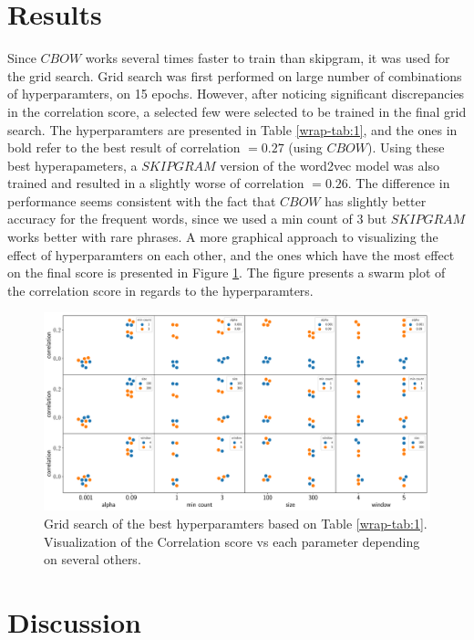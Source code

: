 \documentclass[12pt,a4paper]{article}
\begin{document}
\section{Results}

Since $CBOW$ works several times faster to train than skipgram, it was used for the grid search.
Grid search was first performed on large number of combinations of hyperparamters, on 15 epochs. However, after noticing significant discrepancies in the correlation score, a selected few were selected to be trained in the final grid search. The hyperparamters are presented in Table \ref{wrap-tab:1}, and the ones in bold refer to the best result of correlation $= 0.27$ (using $CBOW$). Using these best hyperapameters, a $SKIPGRAM$ version of the word2vec model was also trained and resulted in a slightly worse of correlation $= 0.26$. The difference in performance seems consistent with the fact that $CBOW$ has slightly better accuracy for the frequent words, since we used a min count of 3 but $SKIPGRAM$ works better with rare phrases. A more graphical approach to visualizing the effect of hyperparamters on each other, and the ones which have the most effect on the final score is presented in Figure \ref{img:grid}. The figure presents a swarm plot of the correlation score in regards to the hyperparamters. 

\begin{figure}[h]
\begin{center}
\includegraphics[width=\columnwidth, angle = 0]{img/grid.pdf}
\end{center}
\caption{Grid search of the best hyperparamters based on Table \ref{wrap-tab:1}. Visualization of the Correlation score vs each parameter depending on several others.}
\label{img:grid}
\end{figure}
 
\section{Discussion}
\end{document}

